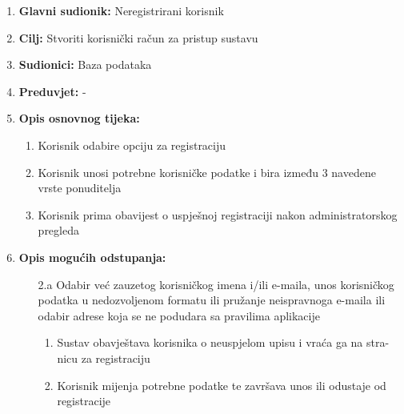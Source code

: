 \noindent {}
\begin{enumerate}
	
	\item \textbf{Glavni sudionik: }Neregistrirani korisnik
	\item  \textbf{Cilj:} Stvoriti korisnički račun za pristup sustavu 
	\item  \textbf{Sudionici:} Baza podataka
	\item  \textbf{Preduvjet:} - 
	\item  \textbf{Opis osnovnog tijeka:}
	
	\begin{enumerate}
		
		\item Korisnik odabire opciju za registraciju
		\item Korisnik unosi potrebne korisničke podatke i bira između 3 navedene vrste ponuditelja
		\item Korisnik prima obavijest o uspješnoj registraciji nakon administratorskog pregleda
		
	\end{enumerate}
	
		
	\item  \textbf{Opis mogućih odstupanja:}
	
	\item[] \begin{enumerate}
		
		\item[2.a] Odabir već zauzetog korisničkog imena i/ili e-maila, unos korisničkog
		podatka u nedozvoljenom formatu ili pružanje neispravnoga e-maila ili odabir adrese koja se ne podudara sa pravilima aplikacije
		\item[] \begin{enumerate}
			
			\item Sustav obavještava korisnika o neuspjelom upisu i vraća ga na stra-
			nicu za registraciju
			\item Korisnik mijenja potrebne podatke te završava unos ili odustaje od registracije
			
		\end{enumerate}
		
	\end{enumerate}
	
\end{enumerate}

